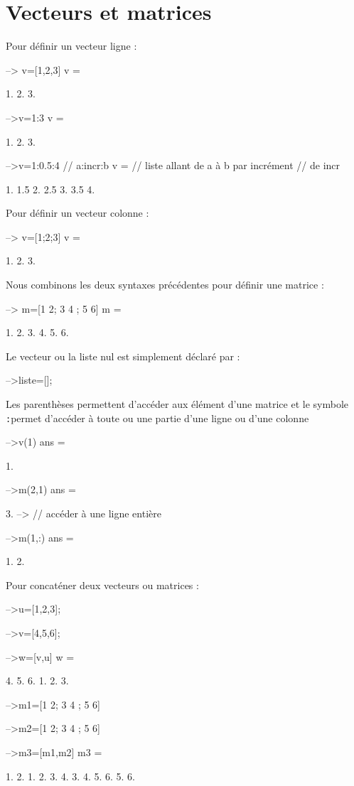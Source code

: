 \section{Vecteurs et matrices}
Pour définir un vecteur ligne :
\begin{Scilabcode}
--> v=[1,2,3]
 v  =
 
    1.    2.    3. 

-->v=1:3
 v  =
 
    1.    2.    3.

-->v=1:0.5:4              // a:incr:b
 v  =                     // liste allant de a à b par incrément 
                          // de incr
 
    1.    1.5    2.    2.5    3.    3.5    4.
\end{Scilabcode}
Pour définir un vecteur colonne :
\begin{Scilabcode}
--> v=[1;2;3]
 v  =
 
    1.    
    2.
    3. 
\end{Scilabcode}
Nous combinons les deux syntaxes précédentes pour définir une matrice : 
\begin{Scilabcode}
--> m=[1 2; 3 4 ; 5 6]
 m  =
 
    1.    2.  
    3.    4.  
    5.    6.  
\end{Scilabcode}
Le vecteur ou la liste nul est simplement déclaré par :
\begin{Scilabcode}
-->liste=[];
\end{Scilabcode}
Les parenthèses permettent d'accéder aux élément d'une matrice et le 
symbole \og\verb?:?\fg permet d'accéder à toute ou une partie d'une 
ligne ou d'une colonne
\begin{Scilabcode}
-->v(1)
 ans  =
 
    1.  

-->m(2,1)
 ans  =
 
    3.  
--> // accéder à une ligne entière
 
-->m(1,:)
 ans  =
   
     1.    2. 
\end{Scilabcode}
Pour concaténer deux vecteurs ou matrices :
\begin{Scilabcode}
-->u=[1,2,3];
 
-->v=[4,5,6];
 
-->w=[v,u]
 w  =
 
    4.    5.    6.    1.    2.    3.

-->m1=[1 2; 3 4 ; 5 6]
 
-->m2=[1 2; 3 4 ; 5 6]
 
-->m3=[m1,m2]
 m3  =
 
    1.    2.    1.    2.  
    3.    4.    3.    4.  
    5.    6.    5.    6. 
\end{Scilabcode}
